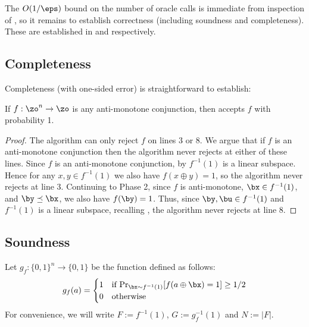 \documentclass[11pt]{article}
\theoremstyle{definition}
\begin{document}
The $O(1/\eps)$ bound on the number of oracle calls is immediate from inspection of , so it remains to establish correctness (including soundness and completeness).
These are established in  and  respectively.




\subsection{Completeness} 

Completeness (with one-sided error) is straightforward to establish:  
\begin{theorem}\label{thm: f is mono conj}
If $f: \zo^n \to \zo$ is any anti-monotone conjunction, then  accepts $f$ with probability 1.
\end{theorem}

\begin{proof}
The algorithm can only reject $f$ on lines $3$ or $8$. We argue that if $f$ is an anti-monotone conjunction then the algorithm never rejects at either of these lines. Since $f$ is an anti-monotone conjunction, by  $f^{-1}(1)$ is a linear subspace. Hence for any $x,y \in f^{-1}(1)$ we also have $f(x \oplus y)=1$, so the algorithm never rejects at line $3$.
Continuing to Phase 2, since $f$ is anti-monotone, $\bx \in f^{-1}(1)$, and $\by \preceq \bx$, we also have $f(\by)=1$. Thus, since $\by, \bu \in f^{-1}(1)$ and $f^{-1}(1)$ is a linear subspace, recalling , the algorithm never rejects at line $8$. 
\end{proof}





\subsection{Soundness} \label{sec:conjunction-soundness}


Let $g_f : \{0,1\}^n \to \{0,1\}$ be the function defined as follows:
\begin{equation} \label{eq:g}
g_f(a)=\begin{cases}
         1 & \text{if $\Pr_{\bx \sim f^{-1}(1)}[f(a \oplus \bx)=1] \geq 1/2$} \\
         0 & \text{otherwise}
    \end{cases}
\end{equation}
For convenience, we will write $F := f^{-1}(1)$, $G := g_f^{-1}(1)$ and $N:=|F |$. 
\end{document}
